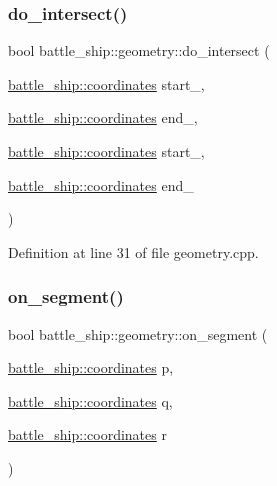 \subsubsection{\texorpdfstring{do\+\_\+intersect()}{do\_intersect()}}
{\footnotesize\ttfamily bool battle\+\_\+ship\+::geometry\+::do\+\_\+intersect (\begin{DoxyParamCaption}\item[{\hyperlink{structbattle__ship_1_1coordinates}{battle\+\_\+ship\+::coordinates}}]{start\+\_,  }\item[{\hyperlink{structbattle__ship_1_1coordinates}{battle\+\_\+ship\+::coordinates}}]{end\+\_,  }\item[{\hyperlink{structbattle__ship_1_1coordinates}{battle\+\_\+ship\+::coordinates}}]{start\+\_,  }\item[{\hyperlink{structbattle__ship_1_1coordinates}{battle\+\_\+ship\+::coordinates}}]{end\+\_ }\end{DoxyParamCaption})\hspace{0.3cm}{\ttfamily [static]}}



Definition at line 31 of file geometry.\+cpp.

\mbox{\label{classbattle__ship_1_1geometry_a69fccbb7267eb16930041fbdfeb1064a}} 
\subsubsection{\texorpdfstring{on\+\_\+segment()}{on\_segment()}}
{\footnotesize\ttfamily bool battle\+\_\+ship\+::geometry\+::on\+\_\+segment (\begin{DoxyParamCaption}\item[{\hyperlink{structbattle__ship_1_1coordinates}{battle\+\_\+ship\+::coordinates}}]{p,  }\item[{\hyperlink{structbattle__ship_1_1coordinates}{battle\+\_\+ship\+::coordinates}}]{q,  }\item[{\hyperlink{structbattle__ship_1_1coordinates}{battle\+\_\+ship\+::coordinates}}]{r }\end{DoxyParamCaption})\hspace{0.3cm}{\ttfamily [static]}}



